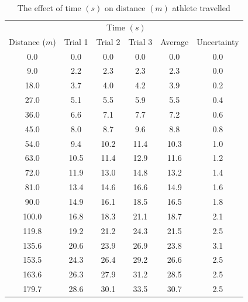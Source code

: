 \documentclass[index]{subfiles}
\begin{document}
\begin{table}[H]
    \centering
    \caption{The effect of time \((s)\) on distance \((m)\) athlete travelled}
    \begin{tabular}{@{}cccccc@{}} \toprule
                         & \multicolumn{4}{c}{Time \((s)\)}                                             \\ \cmidrule(r){2-5}
        Distance (\(m\)) & Trial 1                          & Trial 2 & Trial 3 & Average & Uncertainty \\ \midrule
        0.0              & 0.0                              & 0.0     & 0.0     & 0.0     & 0.0         \\
        9.0              & 2.2                              & 2.3     & 2.3     & 2.3     & 0.0         \\
        18.0             & 3.7                              & 4.0     & 4.2     & 3.9     & 0.2         \\
        27.0             & 5.1                              & 5.5     & 5.9     & 5.5     & 0.4         \\
        36.0             & 6.6                              & 7.1     & 7.7     & 7.2     & 0.6         \\
        45.0             & 8.0                              & 8.7     & 9.6     & 8.8     & 0.8         \\
        54.0             & 9.4                              & 10.2    & 11.4    & 10.3    & 1.0         \\
        63.0             & 10.5                             & 11.4    & 12.9    & 11.6    & 1.2         \\
        72.0             & 11.9                             & 13.0    & 14.8    & 13.2    & 1.4         \\
        81.0             & 13.4                             & 14.6    & 16.6    & 14.9    & 1.6         \\
        90.0             & 14.9                             & 16.1    & 18.5    & 16.5    & 1.8         \\
        100.0            & 16.8                             & 18.3    & 21.1    & 18.7    & 2.1         \\
        119.8            & 19.2                             & 21.2    & 24.3    & 21.5    & 2.5         \\
        135.6            & 20.6                             & 23.9    & 26.9    & 23.8    & 3.1         \\
        153.5            & 24.3                             & 26.4    & 29.2    & 26.6    & 2.5         \\
        163.6            & 26.3                             & 27.9    & 31.2    & 28.5    & 2.5         \\
        179.7            & 28.6                             & 30.1    & 33.5    & 30.7    & 2.5         \\
    \end{tabular}
\end{table}
\end{document}
